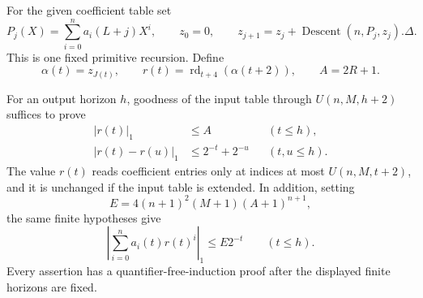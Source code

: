 For the given coefficient table set
\[
 P_j(X)=\sum_{i=0}^n a_i(L+j)X^i,
 \qquad z_0=0,
 \qquad z_{j+1}=z_j+\operatorname{Descent}(n,P_j,z_j).\Delta.
 \tag{F3}\label{eq:fta-trajectory}
\]
This is one fixed primitive recursion.  Define
\[
 \alpha(t)=z_{J(t)},\qquad
 r(t)=\operatorname{rd}_{t+4}(\alpha(t+2)),\qquad A=2R+1.
 \tag{F4}\label{eq:fta-root-normalized}
\]

\begin{lemma}\label{lem:fta-root-table}
For an output horizon $h$, goodness of the input table through
$U(n,M,h+2)$ suffices to prove
\begin{align*}
 |r(t)|_1&\le A &&(t\le h),\\
 |r(t)-r(u)|_1&\le 2^{-t}+2^{-u} &&(t,u\le h).
\end{align*}
The value $r(t)$ reads coefficient entries only at indices at most
$U(n,M,t+2)$, and it is unchanged if the input table is extended.
In addition, setting
\[
 E=4(n+1)^2(M+1)(A+1)^{n+1},
 \tag{F5}\label{eq:fta-E}
\]
the same finite hypotheses give
\[
 \left|\sum_{i=0}^n a_i(t)r(t)^i\right|_1\le E2^{-t}
 \qquad(t\le h).
 \tag{F6}\label{eq:fta-same-precision-residual}
\]
Every assertion has a quantifier-free-induction proof after the displayed
finite horizons are fixed.
\end{lemma}

